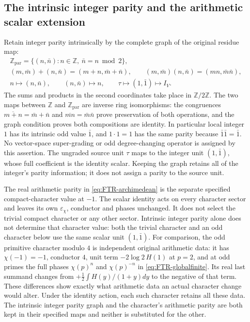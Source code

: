 \subsection{The intrinsic integer parity and the arithmetic scalar extension}

Retain integer parity intrinsically by the complete graph of
the original residue map:
\begin{equation}\tag{FTR23}\label{eq:FTR-intrinsicparity}
 \begin{gathered}
 \mathbb Z_{\mathrm{par}}
   =\{(n,\bar n):n\in\mathbb Z,\ \bar n=n\bmod2\},\\
 (m,\bar m)+(n,\bar n)=(m+n,\bar m+\bar n),\qquad
 (m,\bar m)(n,\bar n)=(mn,\bar m\bar n),\\
 n\longmapsto(n,\bar n),\qquad
 (n,\bar n)\longmapsto n,\qquad
 \tau\longmapsto(1,\bar1)\longmapsto I_V.
 \end{gathered}
\end{equation}
The sums and products in the second coordinates take place in
$\mathbb Z/2\mathbb Z$. The two maps between $\mathbb Z$ and
$\mathbb Z_{\mathrm{par}}$ are inverse ring isomorphisms:
the congruences $\overline{m+n}=\bar m+\bar n$ and
$\overline{mn}=\bar m\bar n$ prove preservation of both
operations, and the graph condition proves both compositions
are identity. In particular local integer $1$ has its intrinsic
odd value $\bar1$, and $1\cdot1=1$ has the same parity because
$\bar1\bar1=\bar1$. No vector-space super-grading or odd
degree-changing operator is assigned by this assertion.
The ungraded source unit $\tau$ maps to the integer unit
$(1,\bar1)$, whose full coefficient is the identity scalar.
Keeping the graph retains all of the integer's parity
information; it does not assign a parity to the source unit.

The real arithmetic parity in \eqref{eq:FTR-archimedean} is
the separate specified compact-character value at $-1$.
The scalar identity acts on every character sector and leaves
its own $\varepsilon_\chi$, conductor and phases unchanged.
It does not select the trivial compact character or any other
sector. Intrinsic integer parity alone does not determine that
character value: both the trivial character and an odd
character below use the same scalar unit $(1,\bar1)$.
For comparison, the odd primitive character modulo
$4$ is independent original arithmetic data: it has
$\chi(-1)=-1$, conductor $4$, unit term
$-2\log2\,H(1)$ at $p=2$, and at odd primes the full phases
$\chi(p)^n$ and $\chi(p)^{-n}$ in
\eqref{eq:FTR-globalfinite}. Its real last summand changes from
$+\tfrac12\int H(y)/(1+y)dy$ to the negative of that term.
These differences show exactly what arithmetic data an actual
character change would alter. Under the identity action, each
such character retains all these data. The intrinsic integer
parity graph and the character's arithmetic parity are both
kept in their specified maps and neither is substituted for
the other.


